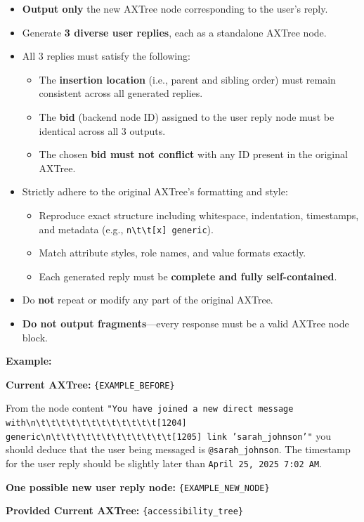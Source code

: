 \begin{promptbox}
\begin{itemize}
  \item \textbf{Output only} the new AXTree node corresponding to the user's reply.
  \item Generate \textbf{3 diverse user replies}, each as a standalone AXTree node.
  \item All 3 replies must satisfy the following:
  \begin{itemize}
    \item The \textbf{insertion location} (i.e., parent and sibling order) must remain consistent across all generated replies.
    \item The \textbf{bid} (backend node ID) assigned to the user reply node must be identical across all 3 outputs.
    \item The chosen \textbf{bid must not conflict} with any ID present in the original AXTree.
  \end{itemize}
  \item Strictly adhere to the original AXTree's formatting and style:
  \begin{itemize}
    \item Reproduce exact structure including whitespace, indentation, timestamps, and metadata (e.g., \texttt{n\textbackslash t\textbackslash t[x] generic}).
    \item Match attribute styles, role names, and value formats exactly.
    \item Each generated reply must be \textbf{complete and fully self-contained}.
  \end{itemize}
  \item Do \textbf{not} repeat or modify any part of the original AXTree.
  \item \textbf{Do not output fragments}---every response must be a valid AXTree node block.
\end{itemize}

\textbf{Example: }

\textbf{Current AXTree:}  
\texttt{\{EXAMPLE\_BEFORE\}}

From the node content  
\texttt{"You have joined a new direct message with\textbackslash n\textbackslash t\textbackslash t\textbackslash t\textbackslash t\textbackslash t\textbackslash t\textbackslash t\textbackslash t\textbackslash t\textbackslash t\textbackslash t\textbackslash t[1204] generic\textbackslash n\textbackslash t\textbackslash t\textbackslash t\textbackslash t\textbackslash t\textbackslash t\textbackslash t\textbackslash t\textbackslash t\textbackslash t\textbackslash t\textbackslash t[1205] link 'sarah\_johnson'"}  
you should deduce that the user being messaged is \texttt{@sarah\_johnson}.  
The timestamp for the user reply should be slightly later than \texttt{April 25, 2025 7:02 AM}.

\textbf{One possible new user reply node:}  
\texttt{\{EXAMPLE\_NEW\_NODE\}}

\textbf{Provided Current AXTree: }\texttt{\{accessibility\_tree\}}

\end{promptbox}


